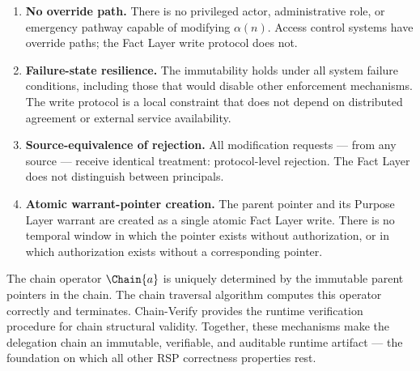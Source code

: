 \begin{enumerate}
\item[(1)] \textbf{No override path.} There is no privileged actor, administrative role, or emergency pathway capable of modifying $\alpha(n)$. Access control systems have override paths; the Fact Layer write protocol does not.

\item[(2)] \textbf{Failure-state resilience.} The immutability holds under all system failure conditions, including those that would disable other enforcement mechanisms. The write protocol is a local constraint that does not depend on distributed agreement or external service availability.

\item[(3)] \textbf{Source-equivalence of rejection.} All modification requests --- from any source --- receive identical treatment: protocol-level rejection. The Fact Layer does not distinguish between principals.

\item[(4)] \textbf{Atomic warrant-pointer creation.} The parent pointer and its Purpose Layer warrant are created as a single atomic Fact Layer write. There is no temporal window in which the pointer exists without authorization, or in which authorization exists without a corresponding pointer.
\end{enumerate}

The chain operator $\Chain{a}$ is uniquely determined by the immutable parent pointers in the chain. The chain traversal algorithm computes this operator correctly and terminates. Chain-Verify provides the runtime verification procedure for chain structural validity. Together, these mechanisms make the delegation chain an immutable, verifiable, and auditable runtime artifact --- the foundation on which all other RSP correctness properties rest.
